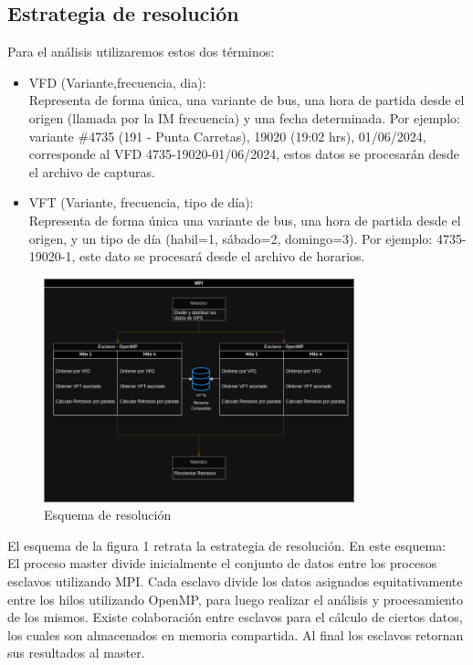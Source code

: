 \documentclass[journal]{IEEEtran}
\begin{document}
\subsection{Estrategia de resolución}
Para el análisis utilizaremos estos dos términos: 

\begin{itemize}
  \item VFD (Variante,frecuencia,  dia): \\Representa de forma única, una variante de bus, una hora de partida desde el origen (llamada por la IM frecuencia) y una fecha determinada. Por ejemplo: variante \#4735 (191 - Punta Carretas), 19020 (19:02 hrs), 01/06/2024, corresponde al VFD 4735-19020-01/06/2024, estos datos se procesarán desde el archivo de capturas.
  \item VFT (Variante, frecuencia, tipo de día): \\Representa de forma única una variante de bus, una hora de partida desde el origen, y un tipo de día (habil=1, sábado=2, domingo=3). Por ejemplo: 4735-19020-1, este dato se procesará desde el archivo de horarios.
\end{itemize}

\begin{figure}
  \centering
  \includegraphics[width=9cm]{diagrama}
  \caption{Esquema de resolución}
\end{figure}

El esquema de la figura 1 retrata la estrategia de resolución. En este esquema:\\
El proceso master divide inicialmente el conjunto de datos entre los procesos esclavos utilizando MPI.
Cada esclavo divide los datos asignados equitativamente entre los hilos utilizando OpenMP, para luego realizar el análisis y procesamiento de los mismos.
Existe colaboración entre esclavos para el cálculo de ciertos datos, los cuales son almacenados en memoria compartida.
Al final los esclavos retornan sus resultados al master.
\end{document}
